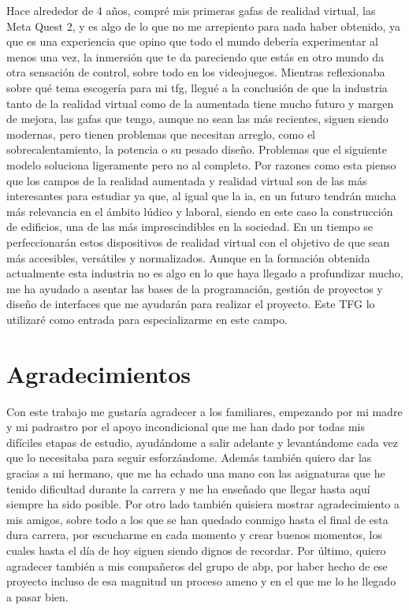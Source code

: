     Hace alrededor de 4 años, compré mis primeras gafas de realidad virtual, las Meta Quest 2, y es algo de lo que no me arrepiento para nada haber obtenido, ya que es una experiencia que opino que todo el mundo debería experimentar al menos una vez, la inmersión que te da pareciendo que estás en otro mundo da otra sensación de control, sobre todo en los videojuegos.
    Mientras reflexionaba sobre qué tema escogería para mi \gls{tfg}, llegué a la conclusión de que la industria tanto de la realidad virtual como de la aumentada tiene mucho futuro y margen de mejora, las gafas que tengo, aunque no sean las más recientes, siguen siendo modernas, pero tienen problemas que necesitan arreglo, como el sobrecalentamiento, la potencia o su pesado diseño. Problemas que el siguiente modelo soluciona ligeramente pero no al completo.
    Por razones como esta pienso que los campos de la realidad aumentada y realidad virtual son de las más interesantes para estudiar ya que, al igual que la \gls{ia}, en un futuro tendrán mucha más relevancia en el ámbito lúdico y laboral, siendo en este caso la construcción de edificios, una de las más imprescindibles en la sociedad. En un tiempo se perfeccionarán estos dispositivos de realidad virtual con el objetivo de que sean más accesibles, versátiles y normalizados.
    Aunque en la formación obtenida actualmente esta industria no es algo en lo que haya llegado a profundizar mucho, me ha ayudado a asentar las bases de la programación, gestión de proyectos y diseño de interfaces que me ayudarán para realizar el proyecto. Este TFG lo utilizaré como entrada para especializarme en este campo.

\cleardoublepage %
\chapter*{Agradecimientos}

\thispagestyle{empty}
\vspace{1cm}

    Con este trabajo me gustaría agradecer a los familiares, empezando por mi madre y mi padrastro por el apoyo incondicional que me han dado por todas mis difíciles etapas de estudio, ayudándome a salir adelante y levantándome cada vez que lo necesitaba para seguir esforzándome.
    Además también quiero dar las gracias a mi hermano, que me ha echado una mano con las asignaturas que he tenido dificultad durante la carrera y me ha enseñado que  llegar hasta aquí siempre ha sido posible.
    Por otro lado también quisiera mostrar agradecimiento a mis amigos, sobre todo a los que se han quedado conmigo hasta el final de esta dura carrera, por escucharme en cada momento y crear buenos momentos, los cuales hasta el día de hoy siguen siendo dignos de recordar.
    Por último, quiero agradecer también a mis compañeros del grupo de \gls{abp}, por haber hecho de ese proyecto incluso de esa magnitud un proceso ameno y en el que me lo he llegado a pasar bien.

